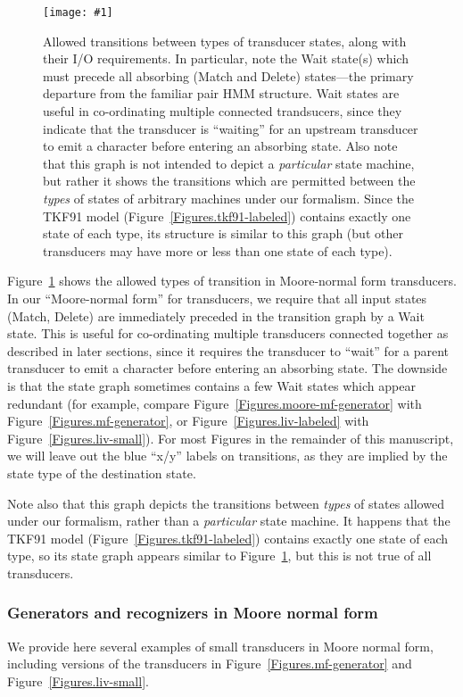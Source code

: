 \documentclass{article}
\newcommand{\seclabel}[1]{\label{sec.#1}}
\newcommand{\figref}[1]{Figure~\ref{Figures.#1}}
\newcommand{\figlabel}[1]{\label{Figures.#1}}
\newcommand{\easyfig}[4]{
\begin{figure}
\texttt{[image: \#1]}
\caption{ \figlabel{#3} #4}
\end{figure}}
\newcommand{\pngfig}[2]{\easyfig{#1.png}{}{#1}{#2}}
\begin{document}
\pngfig{transitions}
{Allowed transitions between types of transducer states, along with their I/O requirements.
In particular, note the Wait state(s) which must precede all 
absorbing (Match and Delete) states---the primary departure from the familiar pair HMM
structure.  
Wait states are useful in co-ordinating multiple connected trandsucers, since they indicate that
the transducer is ``waiting'' for an upstream transducer to emit a character before entering an
absorbing state. 
Also note that this graph is not intended to depict a {\em particular} state machine, 
but rather it shows the transitions which are permitted between the {\em types}
of states of arbitrary machines under our formalism.  
Since the TKF91 model (\figref{tkf91-labeled}) contains exactly one state of each type,
 its structure is similar to this graph 
(but other transducers may have more or less than one state of each type).  }


\figref{transitions} shows the allowed types of transition in Moore-normal form transducers.
In our ``Moore-normal form'' for transducers, we require that all input states (Match, Delete)
are immediately preceded in the transition graph by a Wait state.
This is useful for co-ordinating multiple transducers connected together as described in later sections,
since it requires
the transducer to ``wait'' for a parent transducer to emit a character before entering an
absorbing state. 
The downside is that the state graph sometimes contains a few  Wait states which appear redundant
(for example, compare \figref{moore-mf-generator} with \figref{mf-generator},
or \figref{liv-labeled} with \figref{liv-small}).
For most Figures in the remainder of this manuscript, we will leave out the blue ``x/y'' labels on transitions,
as they are implied by the state type of the destination state.

Note also that this graph depicts the transitions between {\em types} of states  allowed under our formalism,
rather than a {\em particular} state machine.  
It happens that the TKF91 model (\figref{tkf91-labeled}) contains exactly one state of each type,
so its state graph appears similar to \figref{transitions},
but this is not true of all transducers.



\subsubsection{Generators and recognizers in Moore normal form}
\seclabel{moore-genrec}
We provide here several examples of small transducers in Moore normal form,
including versions of the transducers in \figref{mf-generator}
and \figref{liv-small}.
\end{document}

